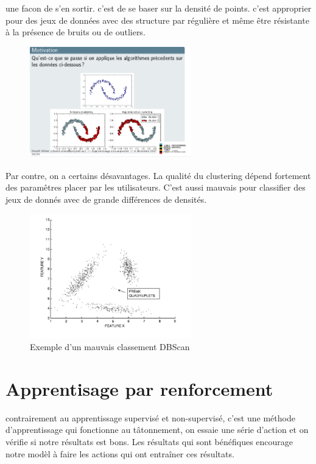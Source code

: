 \documentclass[oneside]{book}
\begin{document}
une facon de s'en sortir. c'est de se baser sur la densité de points. c'est approprier pour des jeux de données avec des structure par régulière et même être résistante à la présence de bruits ou de outliers. \\

\begin{figure}[!ht]
\centering
\includegraphics[width = 7cm]{density_vs_other.png}
\end{figure}

Par contre, on a certains désavantages. La qualité du clustering dépend fortement des paramêtres placer par les utilisateurs. C'est aussi mauvais pour classifier des jeux de donnés avec de grande différences de densités.\\

\begin{figure}[!ht]
\centering
\includegraphics[width = 7cm]{dbscan_drawback.png}
\caption{Exemple d'un mauvais classement DBScan}
\end{figure}

\chapter{Apprentisage par renforcement}
contrairement au apprentissage supervisé et non-supervisé, c'est une méthode d'apprentissage qui fonctionne au tâtonnement, on essaie une série d'action et on vérifie si notre résultats est bons. Les résultats qui sont bénéfiques encourage notre modèl à faire les actions qui ont entraîner ces résultats.\\
\end{document}
